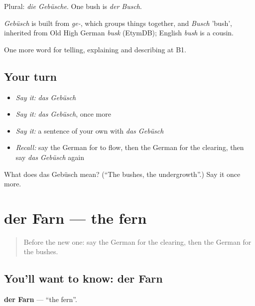 Plural: \emph{die Gebüsche}. One bush is \emph{der Busch}.

\begin{cousinweb}
\emph{Gebüsch} is built from \emph{ge-}, which groups things together, and \emph{Busch} 'bush', inherited from Old High German \emph{busk} (EtymDB); English \emph{bush} is a cousin.
\end{cousinweb}

\begin{grammarlens}[title={What you've built}]
One more word for telling, explaining and describing at B1.
\end{grammarlens}

\subsection*{Your turn}
\begin{itemize}
\raggedright
  \item \emph{Say it:} \emph{das Gebüsch}
  \item \emph{Say it:} \emph{das Gebüsch}, once more
  \item \emph{Say it:} a sentence of your own with \emph{das Gebüsch}
  \item \emph{Recall:} say the German for to flow, then the German for the clearing, then say \emph{das Gebüsch} again
\end{itemize}

\begin{tcolorbox}[breakable,colback=teal!4,colframe=teal!35!black,title={Before you move on}]
What does das Gebüsch mean? (\textquotedblleft{}The bushes, the undergrowth\textquotedblright{}.) Say it once more.
\end{tcolorbox}
\section[der Farn]{der Farn — the fern}

\label{lesson:GE-C456-farn}



\begin{quote}
Before the new one: say the German for the clearing, then the German for the bushes.
\end{quote}

\subsection*{You'll want to know: der Farn}
\textbf{der Farn} — \textquotedblleft{}the fern\textquotedblright{}.

